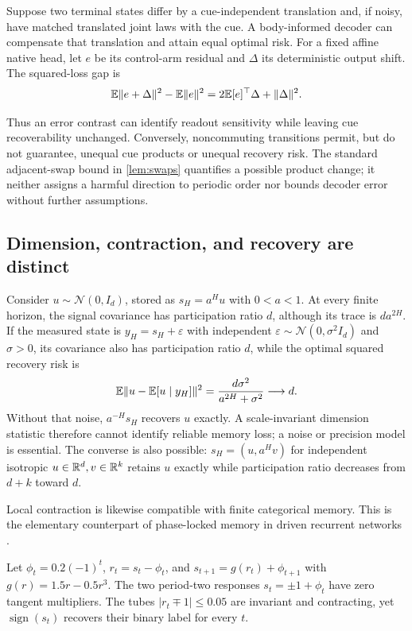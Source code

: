 \begin{corollary}
\label{cor:offset}
Suppose two terminal states differ by a cue-independent translation and,
if noisy, have matched translated joint laws with the cue. A body-informed
decoder can compensate that translation and attain equal optimal risk.
For a fixed affine native head, let $e$ be its control-arm residual and
$\Delta$ its deterministic output shift. The squared-loss gap is
\begin{equation}
 \mathbb{E}\lVert e+\Delta \rVert^2-\mathbb{E}\lVert e \rVert^2
 =2\mathbb{E}[e]^\top\Delta+\lVert \Delta \rVert^2.
 \label{eq:offset-gap}
\end{equation}
\end{corollary}

Thus an error contrast can identify readout sensitivity while leaving cue
recoverability unchanged. Conversely, noncommuting transitions permit, but do
not guarantee, unequal cue products or unequal recovery risk. The standard
adjacent-swap bound in \cref{lem:swaps} quantifies a possible product change;
it neither assigns a harmful direction to periodic order nor bounds decoder
error without further assumptions.

\subsection{Dimension, contraction, and recovery are distinct}

Consider $u\sim\mathcal N(0,I_d)$, stored as $s_H=a^Hu$ with $0<a<1$.
At every finite horizon, the signal covariance has participation ratio $d$,
although its trace is $d a^{2H}$. If the measured state is
$y_H=s_H+\varepsilon$ with independent
$\varepsilon\sim\mathcal N(0,\sigma^2I_d)$ and $\sigma>0$, its covariance
also has participation ratio $d$, while the optimal squared recovery risk is
\begin{equation}
 \mathbb{E}\lVert u-\mathbb{E}[u\mid y_H] \rVert^2
 =\frac{d\sigma^2}{a^{2H}+\sigma^2}\longrightarrow d.
 \label{eq:attenuation-risk}
\end{equation}
Without that noise, $a^{-H}s_H$ recovers $u$ exactly. A scale-invariant
dimension statistic therefore cannot identify reliable memory loss; a noise
or precision model is essential. The converse is also possible:
$s_H=(u,a^Hv)$ for independent isotropic $u\in\mathbb{R}^d,v\in\mathbb{R}^k$ retains $u$
exactly while participation ratio decreases from $d+k$ toward $d$.

Local contraction is likewise compatible with finite categorical memory.
This is the elementary counterpart of phase-locked memory in driven recurrent
networks \citep{pals2024-phase-locked-memory}.
\begin{proposition}
\label{prop:basins}
Let $\phi_t=0.2(-1)^t$, $r_t=s_t-\phi_t$, and
$s_{t+1}=g(r_t)+\phi_{t+1}$ with $g(r)=1.5r-0.5r^3$.
The two period-two responses $s_t=\pm1+\phi_t$ have zero tangent multipliers.
The tubes $|r_t\mp1|\le0.05$ are invariant and contracting, yet
$\operatorname{sign}(s_t)$ recovers their binary label for every $t$.
\end{proposition}


